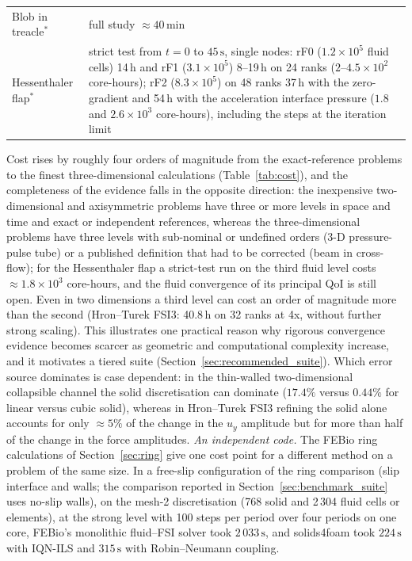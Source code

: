 \begin{table}[htbp]
\begin{tabular}{p{3.0cm}p{10.8cm}}
		Blob in treacle$^\ast$ & full study $\approx40$\,min \\
		Hessenthaler flap$^\ast$ & strict test from $t = 0$ to $45\,\mathrm{s}$, single nodes: rF0 ($1.2\times10^{5}$ fluid cells) 14\,h and rF1 ($3.1\times10^{5}$) 8--19\,h on 24 ranks ($2$--$4.5\times10^{2}$ core-hours); rF2 ($8.3\times10^{5}$) on 48 ranks 37\,h with the zero-gradient and 54\,h with the acceleration interface pressure ($1.8$ and $2.6\times10^{3}$ core-hours), including the steps at the iteration limit \\
		\bottomrule
	\end{tabular}
\end{table}

Cost rises by roughly four orders of magnitude from the exact-reference problems to the finest three-dimensional calculations (Table~\ref{tab:cost}), and the completeness of the evidence falls in the opposite direction: the inexpensive two-dimensional and axisymmetric problems have three or more levels in space and time and exact or independent references, whereas the three-dimensional problems have three levels with sub-nominal or undefined orders (3-D pressure-pulse tube) or a published definition that had to be corrected (beam in cross-flow); for the Hessenthaler flap a strict-test run on the third fluid level costs $\approx1.8\times10^{3}$ core-hours, and the fluid convergence of its principal QoI is still open. Even in two dimensions a third level can cost an order of magnitude more than the second (Hron--Turek FSI3: 40.8\,h on 32 ranks at 4x, without further strong scaling).
This illustrates one practical reason why rigorous convergence evidence becomes scarcer as geometric and computational complexity increase, and it motivates a tiered suite (Section~\ref{sec:recommended_suite}).
Which error source dominates is case dependent: in the thin-walled two-dimensional collapsible channel the solid discretisation can dominate ($17.4\%$ versus $0.44\%$ for linear versus cubic solid), whereas in Hron--Turek FSI3 refining the solid alone accounts for only $\approx5\%$ of the change in the $u_y$ amplitude but for more than half of the change in the force amplitudes.
\emph{An independent code.}
The FEBio ring calculations of Section~\ref{sec:ring} give one cost point for a different method on a problem of the same size.
In a free-slip configuration of the ring comparison (slip interface and walls; the comparison reported in Section~\ref{sec:benchmark_suite} uses no-slip walls), on the mesh-2 discretisation (768 solid and 2\,304 fluid cells or elements), at the strong level with 100 steps per period over four periods on one core, FEBio's monolithic fluid--FSI solver took $2\,033\,\mathrm{s}$, and solids4foam took $224\,\mathrm{s}$ with IQN-ILS and $315\,\mathrm{s}$ with Robin--Neumann coupling.
